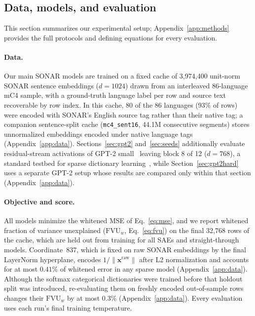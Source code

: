 \documentclass[11pt]{article}
\newcommand{\fvu}{\mathrm{FVU}_w}
\begin{document}




\subsection{Data, models, and evaluation}
\label{sec:setup}

This section summarizes our experimental setup; Appendix~\ref{app:methods}
provides the full protocols and defining equations for every evaluation.

\paragraph{Data.}
Our main SONAR models are trained on a fixed cache of 3{,}974{,}400
unit-norm SONAR sentence embeddings ($d{=}1024$) drawn from an interleaved
86-language mC4 sample, with a ground-truth language label per row and
source text recoverable by row index. In this cache, 80 of the 86 languages (93\% of rows) were encoded with
SONAR's English source tag rather than their native tag; a companion
sentence-split cache (\texttt{mc4\_sent16}, 44.1M consecutive segments)
stores unnormalized embeddings encoded under native language tags
(Appendix~\ref{app:data}). Sections~\ref{sec:gpt2} and~\ref{sec:seeds}
additionally evaluate residual-stream activations of GPT-2
small~\cite{radford2019} leaving block 8 of 12 ($d{=}768$), a standard
testbed for sparse dictionary learning~\cite{gao2024}, while
Section~\ref{sec:gpt2hard} uses a separate GPT-2 setup whose results are
compared only within that section (Appendix~\ref{app:data}).

\paragraph{Objective and score.}
All models minimize the whitened MSE of Eq.~\eqref{eq:mse}, and we report
whitened fraction of variance unexplained ($\fvu$, Eq.~\eqref{eq:fvu}) on
the final 32{,}768 rows of the cache, which are held out from training for
all SAEs and straight-through models. Coordinate~837, which is fixed on
raw SONAR embeddings by the final LayerNorm hyperplane, encodes
$1/\lVert\mathbf{x}^{\mathrm{raw}}\rVert$ after L2 normalization and
accounts for at most $0.41\%$ of whitened error in any sparse model
(Appendix~\ref{app:data}). Although the softmax categorical dictionaries
were trained before that holdout split was introduced, re-evaluating them
on freshly encoded out-of-sample rows changes their $\fvu$ by at most
0.3\% (Appendix~\ref{app:data}). Every evaluation uses each run's final
training temperature.
\end{document}
